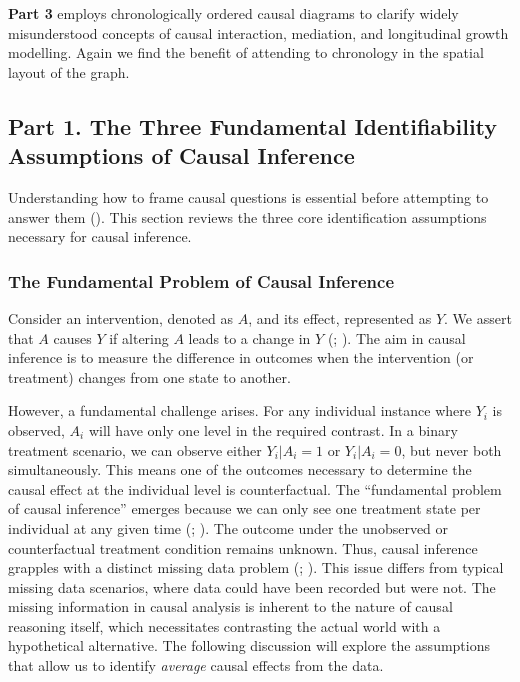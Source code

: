 \documentclass[
  singlecolumn,
  9pt]{article}
\begin{document}
\textbf{Part 3} employs chronologically ordered causal diagrams to
clarify widely misunderstood concepts of causal interaction, mediation,
and longitudinal growth modelling. Again we find the benefit of
attending to chronology in the spatial layout of the graph.

\subsection{Part 1. The Three Fundamental Identifiability Assumptions of
Causal
Inference}\label{part-1.-the-three-fundamental-identifiability-assumptions-of-causal-inference}

Understanding how to frame causal questions is essential before
attempting to answer them (). This section reviews the three core identification
assumptions necessary for causal inference.

\subsubsection{The Fundamental Problem of Causal
Inference}\label{the-fundamental-problem-of-causal-inference}

Consider an intervention, denoted as \(A\), and its effect, represented
as \(Y\). We assert that \(A\) causes \(Y\) if altering \(A\) leads to a
change in \(Y\) (;
). The aim in causal inference is to
measure the difference in outcomes when the intervention (or treatment)
changes from one state to another.

However, a fundamental challenge arises. For any individual instance
where \(Y_i\) is observed, \(A_i\) will have only one level in the
required contrast. In a binary treatment scenario, we can observe either
\(Y_i|A_i = 1\) or \(Y_i|A_i = 0\), but never both simultaneously. This
means one of the outcomes necessary to determine the causal effect at
the individual level is counterfactual. The ``fundamental problem of
causal inference'' emerges because we can only see one treatment state
per individual at any given time (; ). The outcome under the
unobserved or counterfactual treatment condition remains unknown. Thus,
causal inference grapples with a distinct missing data problem
(;
). This issue
differs from typical missing data scenarios, where data could have been
recorded but were not. The missing information in causal analysis is
inherent to the nature of causal reasoning itself, which necessitates
contrasting the actual world with a hypothetical alternative. The
following discussion will explore the assumptions that allow us to
identify \emph{average} causal effects from the data.
\end{document}
